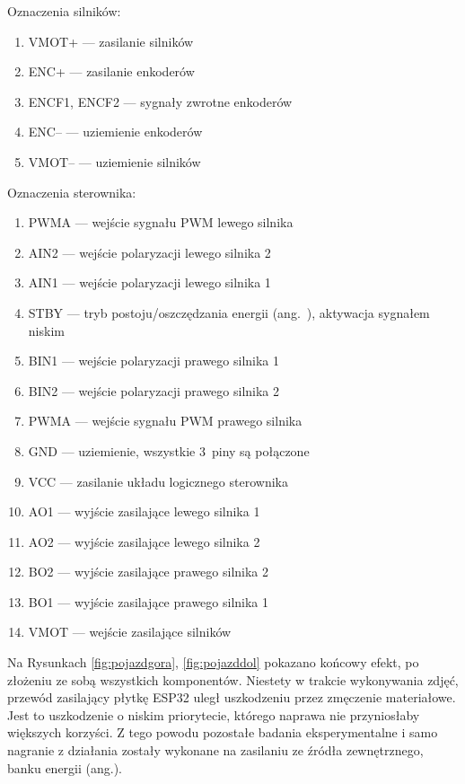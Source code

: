 Oznaczenia silników:
\begin{enumerate}
  \item VMOT+ --- zasilanie silników
  \item ENC+ --- zasilanie enkoderów
  \item ENCF1, ENCF2 --- sygnały zwrotne enkoderów
  \item ENC-- --- uziemienie enkoderów
  \item VMOT-- --- uziemienie silników
\end{enumerate}

\newpage %

Oznaczenia sterownika:
\begin{enumerate}
  \item PWMA --- wejście sygnału PWM lewego silnika
  \item AIN2 --- wejście polaryzacji lewego silnika 2
  \item AIN1 --- wejście polaryzacji lewego silnika 1
  \item STBY --- tryb postoju/oszczędzania energii (ang.~), aktywacja sygnałem niskim
  \item BIN1 --- wejście polaryzacji prawego silnika 1
  \item BIN2 --- wejście polaryzacji prawego silnika 2
  \item PWMA --- wejście sygnału PWM prawego silnika
  \item GND --- uziemienie, wszystkie 3~piny są połączone
  \item VCC --- zasilanie układu logicznego sterownika
  \item AO1 --- wyjście zasilające lewego silnika 1
  \item AO2 --- wyjście zasilające lewego silnika 2
  \item BO2 --- wyjście zasilające prawego silnika 2
  \item BO1 --- wyjście zasilające prawego silnika 1
  \item VMOT --- wejście zasilające silników
\end{enumerate}

Na Rysunkach \ref{fig:pojazdgora}, \ref{fig:pojazddol} pokazano końcowy efekt, po złożeniu ze sobą wszystkich komponentów. Niestety w trakcie wykonywania zdjęć, przewód zasilający płytkę ESP32 uległ uszkodzeniu przez zmęczenie materiałowe. Jest to uszkodzenie o niskim priorytecie, którego naprawa nie przyniosłaby większych korzyści. Z tego powodu pozostałe badania eksperymentalne i samo nagranie z działania zostały wykonane na zasilaniu ze źródła zewnętrznego, banku energii (ang.). 

